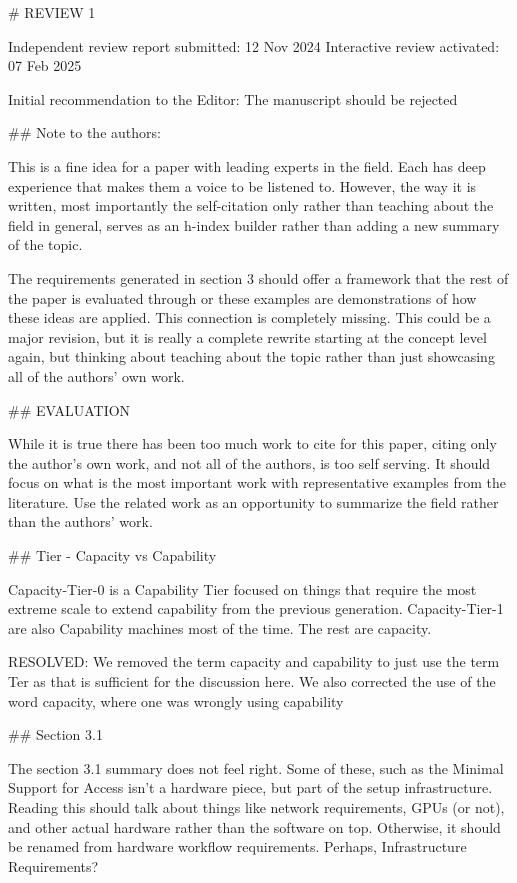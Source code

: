 # REVIEW 1

Independent review report submitted: 12 Nov 2024
Interactive review activated: 07 Feb 2025

Initial recommendation to the Editor: The manuscript should be rejected

## Note to the authors:

This is a fine idea for a paper with leading experts in the field. Each has deep experience that makes them a voice to be listened to. However, the way it is written, most importantly the self-citation only rather than teaching about the field in general, serves as an h-index builder rather than adding a new summary of the topic.

The requirements generated in section 3 should offer a framework that the rest of the paper is evaluated through or these examples are demonstrations of how these ideas are applied. This connection is completely missing. This could be a major revision, but it is really a complete rewrite starting at the concept level again, but thinking about teaching about the topic rather than just showcasing all of the authors' own work.

## EVALUATION

While it is true there has been too much work to cite for this paper, citing only the author's own work, and not all of the authors, is too self serving. It should focus on what is the most important work with representative examples from the literature. Use the related work as an opportunity to summarize the field rather than the authors' work.

## Tier - Capacity vs Capability

Capacity-Tier-0 is a Capability Tier focused on things that require the most extreme scale to extend capability from the previous generation. Capacity-Tier-1 are also Capability machines most of the time. The rest are capacity.

    RESOLVED: We removed the term capacity and capability to just use the term Ter as that is sufficient for the discussion here. We also corrected the use of the word capacity, where one was wrongly using capability

## Section 3.1

The section 3.1 summary does not feel right. Some of these, such as the Minimal Support for Access isn't a hardware piece, but part of the setup infrastructure. Reading this should talk about things like network requirements, GPUs (or not), and other actual hardware rather than the software on top. Otherwise, it should be renamed from hardware workflow requirements. Perhaps, Infrastructure Requirements?

